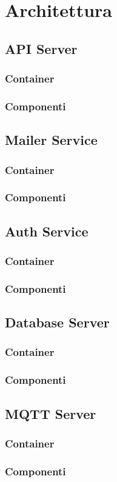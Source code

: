 \chapter{Architettura}

\section{API Server}
\subsection{Container}
\kant[5]

\subsection{Componenti}
\kant[5]

\section{Mailer Service}
\subsection{Container}
\kant[5]

\subsection{Componenti}
\kant[5]

\section{Auth Service}
\subsection{Container}
\kant[5]

\subsection{Componenti}
\kant[5]


\section{Database Server}
\subsection{Container}
\kant[5]

\subsection{Componenti}
\kant[5]


\section{MQTT Server}
\subsection{Container}
\kant[5]

\subsection{Componenti}
\kant[5]

